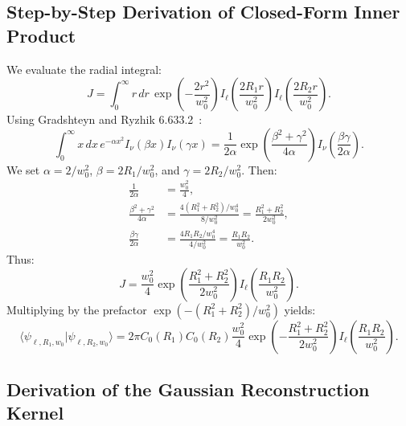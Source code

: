 \documentclass{optica-article}
\begin{document}
\subsection{Step-by-Step Derivation of Closed-Form Inner Product}

We evaluate the radial integral:
\begin{equation}
J = \int_0^\infty r \, dr \, \exp\left( - \frac{2 r^2}{w_0^2} \right) I_\ell\left( \frac{2 R_1 r}{w_0^2} \right) I_\ell\left( \frac{2 R_2 r}{w_0^2} \right).
\label{eq:app_j_integral}
\end{equation}
Using Gradshteyn and Ryzhik 6.633.2~\cite{Gradshteyn2014}:
\begin{equation}
\int_0^\infty x \, dx \, e^{-\alpha x^2} I_\nu(\beta x) I_\nu(\gamma x) = \frac{1}{2\alpha} \exp\left( \frac{\beta^2 + \gamma^2}{4\alpha} \right) I_\nu\left( \frac{\beta \gamma}{2\alpha} \right).
\label{eq:app_weber_ref}
\end{equation}
We set $\alpha = 2 / w_0^2$, $\beta = 2 R_1 / w_0^2$, and $\gamma = 2 R_2 / w_0^2$. Then:
\begin{align}
\frac{1}{2\alpha} &= \frac{w_0^2}{4}, \\
\frac{\beta^2 + \gamma^2}{4\alpha} &= \frac{4(R_1^2 + R_2^2) / w_0^4}{8 / w_0^2} = \frac{R_1^2 + R_2^2}{2 w_0^2}, \\
\frac{\beta \gamma}{2\alpha} &= \frac{4 R_1 R_2 / w_0^4}{4 / w_0^2} = \frac{R_1 R_2}{w_0^2}.
\end{align}
Thus:
\begin{equation}
J = \frac{w_0^2}{4} \exp\left( \frac{R_1^2 + R_2^2}{2 w_0^2} \right) I_\ell\left( \frac{R_1 R_2}{w_0^2} \right).
\label{eq:app_j_result}
\end{equation}
Multiplying by the prefactor $\exp(-(R_1^2 + R_2^2)/w_0^2)$ yields:
\begin{equation}
\langle \psi_{\ell, R_1, w_0} | \psi_{\ell, R_2, w_0} \rangle = 2\pi C_0(R_1) C_0(R_2) \frac{w_0^2}{4} \exp\left( - \frac{R_1^2 + R_2^2}{2 w_0^2} \right) I_\ell\left( \frac{R_1 R_2}{w_0^2} \right).
\label{eq:app_exact_inner_prod}
\end{equation}

\subsection{Derivation of the Gaussian Reconstruction Kernel}
\end{document}
